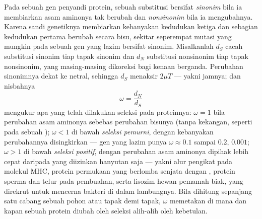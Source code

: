 \begin{definition}[dN/dS]\label{def:b3:molecular-evolution:dnds}
%
Pada sebuah gen penyandi protein, sebuah substitusi bersifat \emph{sinonim} bila ia
membiarkan asam aminonya tak berubah dan \emph{nonsinonim} bila ia
mengubahnya. Karena sandi genetiknya membiarkan kebanyakan kedudukan ketiga dan
sebagian kedudukan pertama berubah secara bisu, sekitar seperempat mutasi
yang mungkin pada sebuah gen yang lazim bersifat sinonim. Misalkanlah $d_{S}$ cacah
substitusi sinonim tiap tapak sinonim dan $d_{N}$
substitusi nonsinonim tiap tapak nonsinonim, yang masing-masing dikoreksi bagi
kenaan berganda. Perubahan sinonimnya dekat ke netral, sehingga $d_{S}$
menaksir $2\mu T$ --- yakni jamnya; dan nisbahnya
\[
\omega = \frac{d_{N}}{d_{S}}
\]
mengukur apa yang telah dilakukan seleksi pada proteinnya: $\omega = 1$ bila
perubahan asam aminonya sebebas perubahan bisunya (tanpa kekangan, seperti pada sebuah
); $\omega < 1$ di bawah \emph{seleksi pemurni}, dengan kebanyakan perubahannya
disingkirkan --- gen yang lazim punya $\omega \approx 0.1$ sampai $0.2$,
 $0.001$; $\omega > 1$ di bawah \emph{seleksi positif}, dengan perubahan asam
aminonya dipihak lebih cepat daripada yang diizinkan hanyutan saja ---
yakni alur pengikat  pada molekul MHC, protein permukaan 
yang berlomba senjata dengan , protein sperma dan telur pada
pembuahan, serta lisozim hewan pemamah biak, yang direkrut untuk
mencerna bakteri di dalam lambungnya. Bila dihitung sepanjang satu cabang sebuah pohon atau
tapak demi tapak, $\omega$ memetakan di mana dan kapan sebuah protein diubah oleh
seleksi alih-alih oleh kebetulan.
\end{definition}

